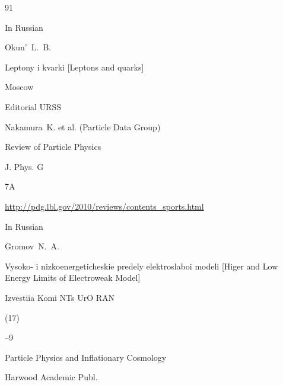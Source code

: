 \begin{thebibliography}{91}






\lang In Russian

\by Okun'~L.~B. 

\book Leptony i kvarki \rm [Leptons and quarks]

\publaddr Moscow

\publ Editorial URSS










\by Nakamura~K. et al. (Particle Data Group)

\paper  Review of Particle Physics

\jour J. Phys. G 


\issue 7A 




\elink \url{http://pdg.lbl.gov/2010/reviews/contents_sports.html}




\lang In Russian

\by Gromov~N.~A.

\paper Vysoko- i nizkoenergeticheskie predely elektroslaboi modeli \rm [Higer and Low Energy Limits of Electroweak Model]

\jour Izvestiia Komi NTs UrO RAN


(17)

--9








\book Particle Physics and Inflationary Cosmology


\publ  Harwood Academic Publ.


\end{thebibliography}
